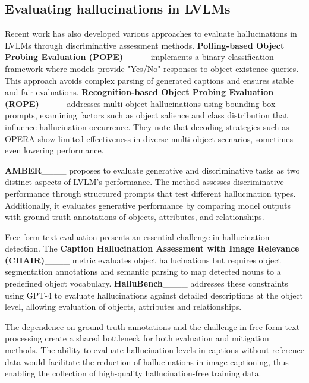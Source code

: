 \subsection{Evaluating hallucinations in LVLMs}\label{subsec-evaluating}
Recent work has also developed various approaches to evaluate hallucinations in LVLMs through discriminative assessment methods. \textbf{Polling-based Object Probing Evaluation (POPE)}____ implements a binary classification framework where models provide "Yes/No" responses to object existence queries. This approach avoids complex parsing of generated captions and ensures stable and fair evaluations. \textbf{Recognition-based Object Probing Evaluation (ROPE)}____ addresses multi-object hallucinations using bounding box prompts, examining factors such as object salience and class distribution that influence hallucination occurrence. They note that decoding strategies such as OPERA show limited effectiveness in diverse multi-object scenarios, sometimes even lowering performance.

\textbf{AMBER}____ proposes to evaluate generative and discriminative tasks as two distinct aspects of LVLM's performance. The method assesses discriminative performance through structured prompts that test different hallucination types. Additionally, it evaluates generative performance by comparing model outputs with ground-truth annotations of objects, attributes, and relationships.

Free-form text evaluation presents an essential challenge in hallucination detection. The \textbf{Caption Hallucination Assessment with Image Relevance (CHAIR)}____ metric evaluates object hallucinations but requires object segmentation annotations and semantic parsing to map detected nouns to a predefined object vocabulary. \textbf{HalluBench}____ addresses these constraints using GPT-4 to evaluate hallucinations against detailed descriptions at the object level, allowing evaluation of objects, attributes and relationships.

The dependence on ground-truth annotations and the challenge in free-form text processing create a shared bottleneck for both evaluation and mitigation methods. The ability to evaluate hallucination levels in captions without reference data would facilitate the reduction of hallucinations in image captioning, thus enabling the collection of high-quality hallucination-free training data.